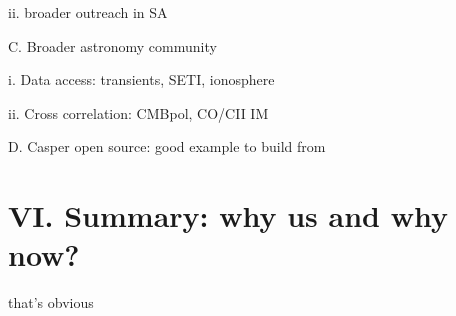 \documentclass[preprint]{aastex}
\begin{document}
ii. broader outreach in SA

C. Broader astronomy community

i. Data access: transients, SETI, ionosphere

ii. Cross correlation: CMBpol, CO/CII IM

D. Casper open source: good example to build from


\section{VI. Summary: why us and why now?} %

that's obvious


\clearpage
\setcounter{page}{1}
\thispagestyle{empty}
%
%


\end{document}
